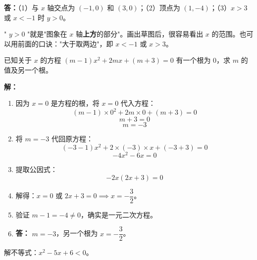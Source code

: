 \documentclass[12pt, a4paper]{ctexart}
\begin{document}
\textbf{答：}（1）与 $x$ 轴交点为 $(-1,0)$ 和 $(3,0)$；（2）顶点为 $(1,-4)$；（3）$x > 3$ 或 $x < -1$ 时 $y > 0$。

\begin{tipbox}[方法总结]
" $y > 0$ "就是"图象在 $x$ 轴\textbf{上方}的部分"。画出草图后，很容易看出 $x$ 的范围。也可以用前面的口诀："大于取两边"，即 $x < -1$ 或 $x > 3$。
\end{tipbox}

\begin{examplebox}[【例题 9】含参问题]
已知关于 $x$ 的方程 $(m-1)x^2 + 2mx + (m+3) = 0$ 有一个根为 $0$，求 $m$ 的值及另一个根。
\end{examplebox}

\textbf{解：}
\begin{enumerate}[leftmargin=2em]
  \item 因为 $x = 0$ 是方程的根，将 $x = 0$ 代入方程：
  \[
  (m - 1) \times 0^2 + 2m \times 0 + (m + 3) = 0
  \]
  \[
  m + 3 = 0
  \]
  \[
  m = -3
  \]
  \item 将 $m = -3$ 代回原方程：
  \[
  (-3 - 1)x^2 + 2 \times (-3) \times x + (-3 + 3) = 0
  \]
  \[
  -4x^2 - 6x = 0
  \]
  \item 提取公因式：
  \[
  -2x(2x + 3) = 0
  \]
  \item 解得：$x = 0$ 或 $2x + 3 = 0 \implies x = -\dfrac{3}{2}$。
  \item 验证 $m - 1 = -4 \neq 0$，确实是一元二次方程。
  \item \textbf{答：} $m = -3$，另一个根为 $x = -\dfrac{3}{2}$。
\end{enumerate}

\begin{examplebox}[【例题 10】解一元二次不等式]
解不等式：$x^2 - 5x + 6 < 0$。
\end{examplebox}
\end{document}

